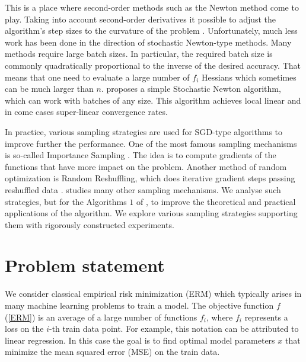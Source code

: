 \documentclass{article}
\theoremstyle{definition}
\theoremstyle{assumption}
\theoremstyle{lemma}
\theoremstyle{theorem}
\theoremstyle{proposition}
\begin{document}
	This is a place where second-order methods such as the Newton method \cite{Nesterov-introductory, Newton-convergence, RSN} come to play. Taking into account second-order derivatives it possible to adjust the algorithm's step sizes to the curvature of the problem \cite{Nesterov-introductory}. Unfortunately, much less work has been done in the direction of stochastic Newton-type methods. Many methods \cite{sub-sampled, exact-inexact, variance-reduced-Newton, zhang2022adaptive, tripuraneni2018stochastic, zhou2020stochastic} require large batch sizes. In particular, the required batch size is commonly quadratically proportional to the inverse of the desired accuracy. That means that one need to evaluate a large number of $f_i$ Hessians which sometimes can be much larger than $n$. \cite{kovalev2019stochastic} proposes a simple Stochastic Newton algorithm, which can work with batches of any size. This algorithm achieves local linear and in come cases super-linear convergence rates. 
	
	In practice, various sampling strategies are used for SGD-type algorithms to improve further the performance. One of the most famous sampling mechanisms is so-called Importance Sampling \cite{gower2019sgd, https://doi.org/10.48550/arxiv.1401.2753, 9413313}. The idea is to compute gradients of the functions that have more impact on the problem. Another method of random optimization is Random Reshuffling, which does iterative gradient steps passing reshuffled data \cite{mishchenko2020random}. \cite{richtarik2016parallel} studies many other sampling mechanisms. We analyse such strategies, but for the Algorithms $1$ of \cite{kovalev2019stochastic}, to improve the theoretical and practical applications of the algorithm. We explore various sampling strategies supporting them with  rigorously constructed experiments. 
	
\section{Problem statement}

	We consider classical empirical risk minimization (ERM) which typically arises in many machine learning problems to train a model. The objective function $f$ (\ref{ERM}) is an average of a large number of functions $f_i$, where $f_i$ represents a loss on the $i$-th train data point. For example, this notation can be attributed to linear regression. In this case the goal is to find optimal model parameters $x$ that minimize the mean squared error (MSE) on the train data.
	
\end{document}
